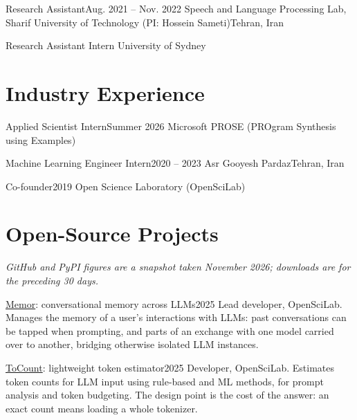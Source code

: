   \resumeSubheading
    {Research Assistant}{Aug. 2021 -- Nov. 2022}
    {Speech and Language Processing Lab, Sharif University of Technology (PI: Hossein Sameti)}{Tehran, Iran}

  \resumeSubheading
    {Research Assistant Intern}{}
    {University of Sydney}{}

\resumeSubHeadingListEnd

\section{Industry Experience}
\resumeSubHeadingListStart

  \resumeSubheading
    {Applied Scientist Intern}{Summer 2026}
    {Microsoft PROSE (PROgram Synthesis using Examples)}{}

  \resumeSubheading
    {Machine Learning Engineer Intern}{2020 -- 2023}
    {Asr Gooyesh Pardaz}{Tehran, Iran}

  \resumeSubheading
    {Co-founder}{2019}
    {Open Science Laboratory (OpenSciLab)}{}

\resumeSubHeadingListEnd

\section{Open-Source Projects}
\vspace{2pt}
{\footnotesize\itshape GitHub and PyPI figures are a snapshot taken November 2026; downloads are for the preceding 30 days.}
\vspace{-2pt}
\resumeSubHeadingListStart

  \cventry
    {\href{https://github.com/openscilab/memor}{Memor}: conversational memory across LLMs}{2025}
    {Lead developer, OpenSciLab. Manages the memory of a user's interactions with LLMs: past conversations can be tapped when prompting, and parts of an exchange with one model carried over to another, bridging otherwise isolated LLM instances.}

  \cventry
    {\href{https://github.com/openscilab/tocount}{ToCount}: lightweight token estimator}{2025}
    {Developer, OpenSciLab. Estimates token counts for LLM input using rule-based and ML methods, for prompt analysis and token budgeting. The design point is the cost of the answer: an exact count means loading a whole tokenizer.}

